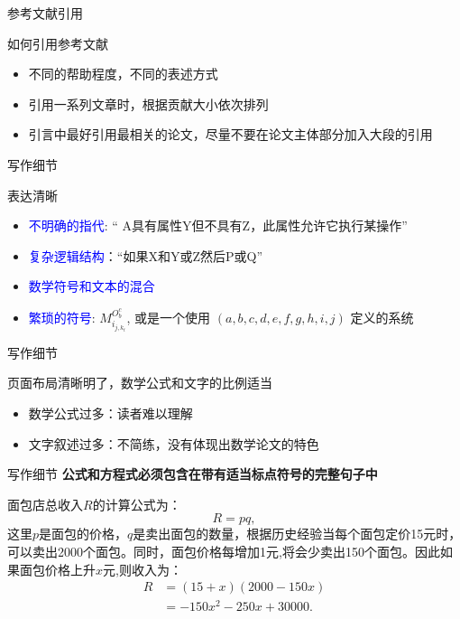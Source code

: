 \documentclass[UTF8]{ctexbeamer}
\begin{document}
\begin{frame}{参考文献引用}
    \begin{alertblock}{如何引用参考文献} 
    \end{alertblock} 
    \begin{itemize}
        \item 不同的帮助程度，不同的表述方式
        \item 引用一系列文章时，根据贡献大小依次排列
        \item 引言中最好引用最相关的论文，尽量不要在论文主体部分加入大段的引用
    \end{itemize}
\end{frame}

\begin{frame}{写作细节}
\begin{alertblock}{表达清晰}
    \begin{itemize}
    \item \textcolor{blue}{不明确的指代}: “ A具有属性Y但不具有Z，此属性允许它执行某操作”
    \item \textcolor{blue}{复杂逻辑结构}：“如果X和Y或Z然后P或Q”
    \item \textcolor{blue}{数学符号和文本的混合}
    \item \textcolor{blue}{繁琐的符号}: $M_{i_{j, k_{t}}}^{O_{b}^{c}}$, 或是一个使用 $(a, b, c, d, e, f, g, h, i, j)$ 定义的系统
    \end{itemize}
\end{alertblock}
\end{frame}

\begin{frame}{写作细节}
    \begin{alertblock}{页面布局清晰明了，数学公式和文字的比例适当}
    \end{alertblock}
    \begin{itemize}
        \item 数学公式过多：读者难以理解
        \item 文字叙述过多：不简练，没有体现出数学论文的特色
    \end{itemize}
\end{frame}

\begin{frame}{写作细节}
\textbf{公式和方程式必须包含在带有适当标点符号的完整句子中}\par
面包店总收入$R$的计算公式为：
$$R=pq,$$
这里$p$是面包的价格，$q$是卖出面包的数量，根据历史经验当每个面包定价15元时，可以卖出2000个面包。同时，面包价格每增加1元,将会少卖出150个面包。因此如果面包价格上升$x$元,则收入为：
\begin{align*}
    R&=(15+x)(2000-150x)\\
   &=-150x^{2}-250x+30000.
\end{align*}
\end{frame}
\end{document}
